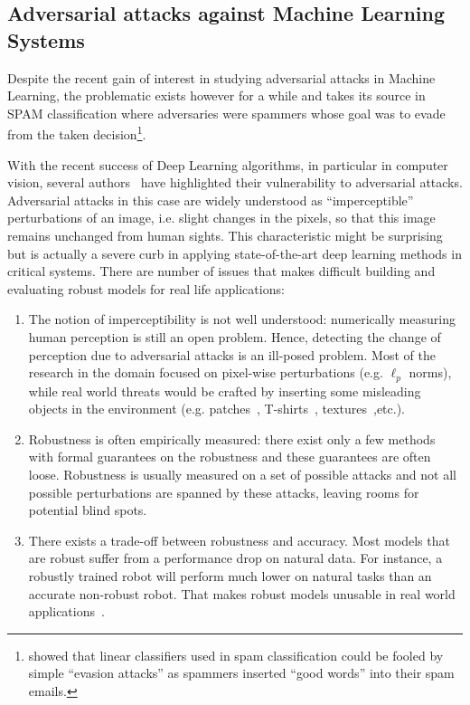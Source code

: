 \subsection{Adversarial attacks against Machine Learning Systems}

Despite the recent gain of interest in studying adversarial attacks in Machine Learning, the problematic exists however for a while and takes its source in SPAM classification where adversaries were spammers whose goal was to evade from the taken decision\footnote{\cite{dalvi2004adversarial} showed that linear classifiers used in spam classification could be fooled by simple ``evasion attacks'' as spammers inserted ``good words'' into their spam emails.}.

With the recent success of Deep Learning algorithms, in particular in computer vision, several authors~\citep{biggio2013evasion,Szegedy2013IntriguingPO} have  highlighted their vulnerability to adversarial attacks. Adversarial attacks in this case are widely understood as ``imperceptible'' perturbations of an image, i.e. slight changes in the pixels, so that this image remains unchanged from human sights. This characteristic might be surprising but is actually a severe curb in applying state-of-the-art deep learning methods in critical systems. There are number of issues that makes difficult building and evaluating robust models for real life applications:
\begin{enumerate}
    \item The notion of imperceptibility is not well understood: numerically measuring human perception is still an open problem. Hence, detecting the change of perception due to adversarial attacks is an ill-posed problem. Most of the  research in the domain focused on pixel-wise perturbations (e.g. $\ell_p$ norms), while real world threats would be crafted by inserting some misleading objects in the environment (e.g. patches~\citep{brown2017adversarial}, T-shirts~\citep{xu2020adversarial}, textures~\citep{wiyatno2019physical},etc.).
    \item Robustness is often empirically measured: there exist only a few methods with formal guarantees on the robustness and these guarantees are often loose. Robustness is usually measured on a set of possible attacks and not all possible perturbations are spanned by these attacks, leaving rooms for potential blind spots.
    \item There exists a trade-off between robustness and accuracy. Most models that are robust suffer from a performance drop on natural data. For instance, a robustly trained robot will perform much lower on natural tasks than an accurate non-robust robot. That makes robust models unusable in real world applications~\citep{lechner2021adversarial}. 
\end{enumerate}

